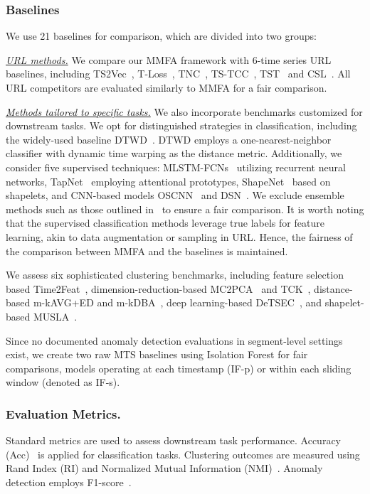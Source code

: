 \documentclass{article}
\begin{document}
\subsubsection{Baselines} We use 21 baselines for comparison, which are divided into two groups:

\textit{\underline{URL methods.}} We compare our MMFA framework with 6-time series URL baselines, including TS2Vec~\cite{yue2022ts2vec}, T-Loss~\cite{franceschi2019unsupervised}, TNC~\cite{tonekaboni2021unsupervised}, TS-TCC~\cite{eldele2021time},  TST~\cite{zerveas2021transformer} and CSL~\cite{liang2023contrastive}. All URL competitors are evaluated similarly to MMFA for a fair comparison.

\textit{\underline{Methods tailored to specific tasks.}} We also incorporate benchmarks customized for downstream tasks. We opt for distinguished strategies in classification, including the widely-used baseline DTWD~\cite{bagnall2018uea}. DTWD employs a one-nearest-neighbor classifier with dynamic time warping as the distance metric. Additionally, we consider five supervised techniques: MLSTM-FCNs~\cite{karim2019multivariate} utilizing recurrent neural networks, TapNet~\cite{zhang2020tapnet} employing attentional prototypes, ShapeNet~\cite{li2021shapenet} based on shapelets, and CNN-based models OSCNN~\cite{tang2020omni} and DSN~\cite{xiao2022dynamic}. We exclude ensemble methods such as those outlined in~\cite{lines2018time} to ensure a fair comparison. It is worth noting that the supervised classification methods leverage true labels for feature learning, akin to data augmentation or sampling in URL. Hence, the fairness of the comparison between MMFA and the baselines is maintained.

We assess six sophisticated clustering benchmarks, including feature selection based Time2Feat~\cite{bonifati2022time2feat}, dimension-reduction-based MC2PCA~\cite{li2019multivariate} and TCK~\cite{mikalsen2018time}, distance-based m-kAVG+ED and m-kDBA~\cite{ozer2020discovering}, deep learning-based DeTSEC~\cite{ienco2020deep}, and shapelet-based MUSLA~\cite{zhang2022multiview}.

Since no documented anomaly detection evaluations in segment-level settings exist, we create two raw MTS baselines using Isolation Forest for fair comparisons, models operating at each timestamp (IF-p) or within each sliding window (denoted as IF-s).

\subsubsection{Evaluation Metrics.} Standard metrics are used to assess downstream task performance. Accuracy (Acc)~\cite{bagnall2018uea} is applied for classification tasks. Clustering outcomes are measured using Rand Index (RI) and Normalized Mutual Information (NMI)~\cite{zhang2022multiview, zhang2018salient}. Anomaly detection employs F1-score~\cite{li2021multivariate}.
\end{document}
